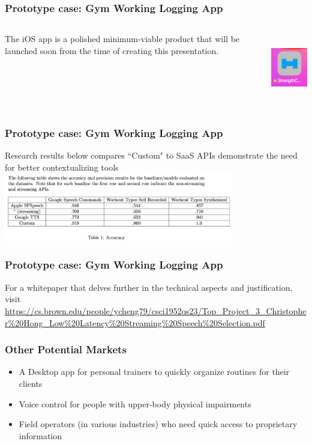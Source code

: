 \documentclass{beamer}
\begin{document}
\begin{frame}
\frametitle{Prototype case: Gym Working Logging App}
\begin{columns}
\begin{column}{0.5\textwidth}
The iOS app is a polished minimum-viable product that will be launched soon from the time of creating this presentation.
\end{column}
\begin{column}{0.5\textwidth}
    \centering
    \includegraphics[height=3cm]{images/sc_icon.png}
\end{column}
\end{columns}
\end{frame}

\begin{frame}
\frametitle{Prototype case: Gym Working Logging App}
Research results below compares ``Custom" to SaaS APIs demonstrate the need for better contextualizing tools \\
\vspace{1cm}
\centering
\includegraphics[height=3cm]{images/preliminary_results.png}
\end{frame}

\begin{frame}
\frametitle{Prototype case: Gym Working Logging App}
For a whitepaper that delves further in the technical aspects and justification, visit \\
\vspace{1cm}
\url{https://cs.brown.edu/people/ycheng79/csci1952qs23/Top_Project_3_Christopher\%20Hong_Low\%20Latency\%20Streaming\%20Speech\%20Selection.pdf}
\end{frame}

\begin{frame}
\frametitle{Other Potential Markets}
\begin{itemize}
    \item A Desktop app for personal trainers to quickly organize routines for their clients
    \item Voice control for people with upper-body physical impairments
    \item Field operators (in various industries) who need quick access to proprietary information
\end{itemize}
\end{frame}
\end{document}
